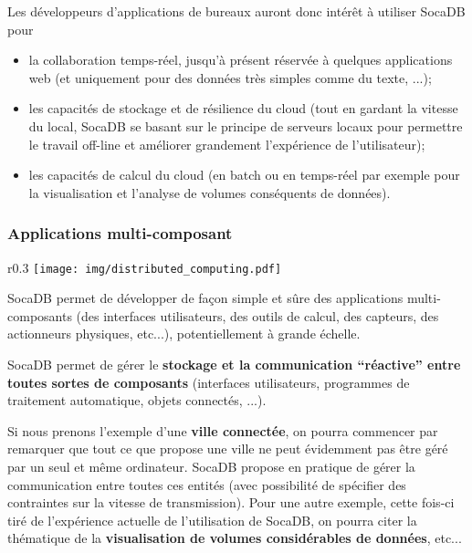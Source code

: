 \documentclass[a4paper,10pt]{scrreprt}
\begin{document}
                \medskip
                Les développeurs d'applications de bureaux auront donc intérêt à utiliser SocaDB pour
                    \begin{itemize}
                        \item la collaboration temps-réel, jusqu'à présent réservée à quelques applications web (et uniquement pour des données très simples comme du texte, ...);
                        \item les capacités de stockage et de résilience du cloud (tout en gardant la vitesse du local, SocaDB se basant sur le principe de serveurs locaux pour permettre le travail off-line et améliorer grandement l'expérience de l'utilisateur);
                        \item les capacités de calcul du cloud (en batch ou en temps-réel par exemple pour la visualisation et l'analyse de volumes conséquents de données).
                    \end{itemize}
                    
            \subsubsection{Applications multi-composant}
            
                \begin{wrapfigure}{r}{0.3\textwidth}
                    \hfill
                    \texttt{[image: img/distributed\_computing.pdf]}
                    \begin{center}
                    \begin{scriptsize}
                        SocaDB permet de développer de façon simple et sûre des applications multi-composants (des interfaces utilisateurs, des outils de calcul, des capteurs, des actionneurs physiques, etc...), potentiellement à grande échelle.
                    \end{scriptsize}
                    \end{center}
                \end{wrapfigure}
                
                SocaDB permet de gérer le \textbf{stockage et la communication ``réactive'' entre toutes sortes de composants} (interfaces utilisateurs, programmes de traitement automatique, objets connectés, ...).
            
                Si nous prenons l'exemple d'une \textbf{ville connectée}, on pourra commencer par remarquer que tout ce que propose une ville ne peut évidemment pas être géré par un seul et même ordinateur. SocaDB propose en pratique de gérer la communication entre toutes ces entités (avec possibilité de spécifier des contraintes sur la vitesse de transmission). Pour une autre exemple, cette fois-ci tiré de l'expérience actuelle de l'utilisation de SocaDB, on pourra citer la thématique de la \textbf{visualisation de volumes considérables de données}, etc...
            
\end{document}
